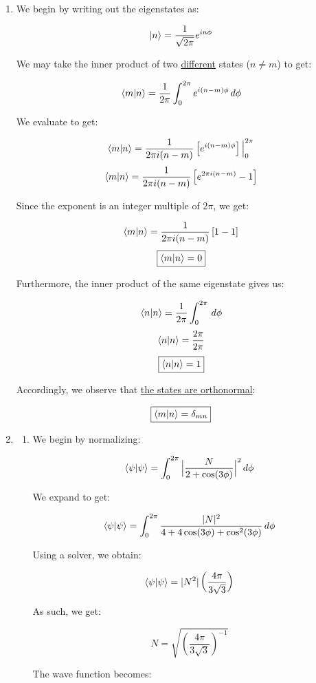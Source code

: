 \begin{enumerate}

  \item We begin by writing out the eigenstates as:

    $$\ket{n}=\frac{1}{\sqrt{2\pi}}e^{in\phi}$$

    We may take the inner product of two \underline{different} states ($n\neq m$) to get:

    $$\bra{m}\ket{n}=\frac{1}{2\pi}\int_0^{2\pi}e^{i(n-m)\phi}\,d\phi$$

    We evaluate to get:

    $$\bra{m}\ket{n}=\frac{1}{2\pi i(n-m)}\left[e^{i(n-m)\phi}\right]\Big|_0^{2\pi}$$
    $$\bra{m}\ket{n}=\frac{1}{2\pi i(n-m)}\left[e^{2\pi i(n-m)}-1\right]$$

    Since the exponent is an integer multiple of $2\pi$, we get:

    $$\bra{m}\ket{n}=\frac{1}{2\pi i(n-m)}\left[1-1\right]$$
    $$\boxed{\bra{m}\ket{n}=0}$$

    Furthermore, the inner product of the same eigenstate gives us:

    $$\braket{n}=\frac{1}{2\pi}\int_0^{2\pi}\,d\phi$$
    $$\braket{n}=\frac{2\pi}{2\pi}$$
    $$\boxed{\braket{n}=1}$$

    Accordingly, we observe that \underline{the states are orthonormal}:

    $$\boxed{\bra{m}\ket{n}=\delta_{mn}}$$

  \item

    \begin{enumerate}

      \item We begin by normalizing:

        $$\braket{\psi}=\int_{0}^{2\pi}\Big|\frac{N}{2+\cos(3\phi)}\Big|^2\,d\phi$$

        We expand to get:

        $$\braket{\psi}=\int_{0}^{2\pi}\frac{|N|^2}{4+4\cos(3\phi)+\cos^2(3\phi)}\,d\phi$$

        Using a solver, we obtain:

        $$\braket{\psi}=|N^2|\left( \frac{4\pi}{3\sqrt{3}} \right)$$

        As such, we get:

        $$\boxed{N=\sqrt{\left(\frac{4\pi}{3\sqrt{3}}\right)^{-1}}}$$

        The wave function becomes:


\end{enumerate}
\end{enumerate}
